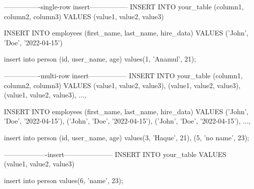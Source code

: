 
----------------single-row insert-----------------
INSERT INTO your_table (column1, column2, column3)
VALUES (value1, value2, value3)

INSERT INTO employees (first_name, last_name, hire_data)
VALUES ('John', 'Doe', '2022-04-15')

insert into person (id, user_name, age) values(1, 'Anamul', 21);


----------------multi-row insert-----------------
INSERT INTO your_table (column1, column2, column3)
VALUES 
    (value1, value2, value3),
    (value1, value2, value3),
    (value1, value2, value3),
    ...,

INSERT INTO employees (first_name, last_name, hire_data)
VALUES 
    ('John', 'Doe', '2022-04-15'),
    ('John', 'Doe', '2022-04-15'),
    ('John', 'Doe', '2022-04-15'),
    ...,

    
insert into person (id, user_name, age) values(3, 'Haque', 21), (5, 'no name', 23);


-------------------insert---------------------
INSERT INTO your_table
VALUES (value1, value2, value3)

insert into person values(6, 'name', 23);